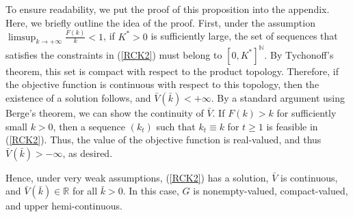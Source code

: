 \documentclass[a4paper,12pt]{article}
\theoremstyle{definition}
\begin{document}
To ensure readability, we put the proof of this proposition into the appendix. Here, we briefly outline the idea of the proof. First, under the assumption $\limsup_{k\to +\infty}\frac{F(k)}{k}<1$, if $K^*>0$ is sufficiently large, the set of sequences that satisfies the constraints in (\ref{RCK2}) must belong to $[0,K^*]^{\mathbb{N}}$. By Tychonoff's theorem, this set is compact with respect to the product topology. Therefore, if the objective function is continuous with respect to this topology, then the existence of a solution follows, and $\bar{V}(\bar{k})<+\infty$. By a standard argument using Berge's theorem, we can show the continuity of $\bar{V}$. If $F(k)>k$ for sufficiently small $k>0$, then a sequence $(k_t)$ such that $k_t\equiv k$ for $t\ge 1$ is feasible in (\ref{RCK2}). Thus, the value of the objective function is real-valued, and thus $\bar{V}(\bar{k})>-\infty$, as desired.

Hence, under very weak assumptions, (\ref{RCK2}) has a solution, $\bar{V}$ is continuous, and $\bar{V}(\bar{k})\in \mathbb{R}$ for all $\bar{k}>0$. In this case, $G$ is nonempty-valued, compact-valued, and upper hemi-continuous.
\end{document}
